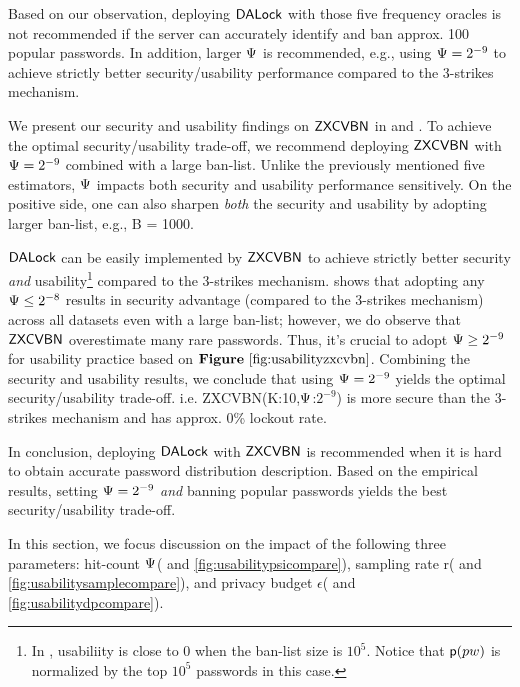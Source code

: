 Based on our observation, deploying $\mathsf{DALock}$ with those five frequency oracles is not recommended if the server can accurately identify and ban approx. 100 popular passwords. In addition, larger $\Psi$ is recommended, e.g., using $\Psi = 2^{-9}$ to achieve strictly better security/usability performance compared to the 3-strikes mechanism.


 We present our security and usability findings on $\mathsf{ZXCVBN}$ in  and . To achieve the optimal security/usability trade-off, we recommend deploying $\mathsf{ZXCVBN}$ with $\Psi =2^{-9}$ combined with a large ban-list. Unlike the previously mentioned five estimators, $\Psi$ impacts both security and usability performance sensitively. On the positive side, one can also sharpen \textit{both} the security and usability by adopting larger ban-list, e.g., B = 1000.

$\mathsf{DALock}$ can be easily implemented by $\mathsf{ZXCVBN}$ to achieve strictly better security \textit{and} usability\footnote{In , usabiliity is close to 0 when the ban-list size is $10^5$. Notice that $\textsf{p}(pw)$ is normalized by the top $10^5$ passwords in this case.} compared to the 3-strikes mechanism.  shows that adopting any $\Psi \le 2^{-8}$ results in security advantage (compared to the 3-strikes mechanism) across all datasets even with a large ban-list; however, we do observe that $\mathsf{ZXCVBN}$ overestimate many rare passwords. Thus, it's crucial to adopt $\Psi \ge 2^{-9}$ for usability practice based on $\lazyref{Figure}{fig:usabilityzxcvbn}$. Combining the security and usability results, we conclude that using $\Psi = 2^{-9}$ yields the optimal security/usability trade-off. i.e. ZXCVBN(K:10,$\Psi$:$2^{-9}$) is more secure than the 3-strikes mechanism and has approx. 0\% lockout rate.

In conclusion, deploying $\mathsf{DALock}$ with $\mathsf{ZXCVBN}$ is recommended when it is hard to obtain accurate password distribution description. Based on the empirical results, setting $\Psi = 2^{-9}$ \textit{and} banning popular passwords yields the best security/usability trade-off.

 In this section, we focus discussion on the impact of the following three parameters: hit-count $\Psi$( and \ref{fig:usabilitypsicompare}), sampling rate r( and \ref{fig:usabilitysamplecompare}), and privacy budget $\epsilon$( and \ref{fig:usabilitydpcompare}).


